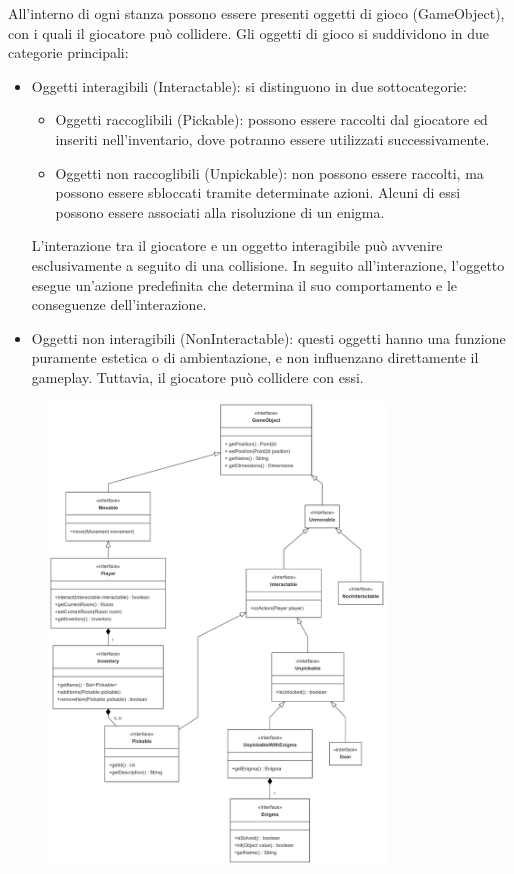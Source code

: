 \documentclass[a4paper,12pt]{report}
\begin{document}
All'interno di ogni stanza possono essere presenti oggetti di gioco (GameObject), con i quali il giocatore può collidere. 
Gli oggetti di gioco si suddividono in due categorie principali:
\begin{itemize}
	\item Oggetti interagibili (Interactable): si distinguono in due sottocategorie:
	\begin{itemize}
		\item Oggetti raccoglibili (Pickable): possono essere raccolti dal giocatore ed inseriti nell’inventario, dove potranno essere utilizzati successivamente.
		\item Oggetti non raccoglibili (Unpickable): non possono essere raccolti, ma possono essere sbloccati tramite determinate azioni. Alcuni di essi possono essere associati alla risoluzione di un enigma.
	\end{itemize}
	L'interazione tra il giocatore e un oggetto interagibile può avvenire esclusivamente a seguito di una collisione. In seguito all'interazione, l'oggetto esegue un'azione predefinita che determina il suo comportamento e le conseguenze dell'interazione.
	\item Oggetti non interagibili (NonInteractable): questi oggetti hanno una funzione puramente estetica o di ambientazione, e non influenzano direttamente il gameplay. Tuttavia, il giocatore può collidere con essi.
\end{itemize}

\begin{figure}   %
    \centering
    \includegraphics[width=0.8\textwidth]{img/gameObject.png}  %
    \label{img:gameObject}
\end{figure}
\end{document}
